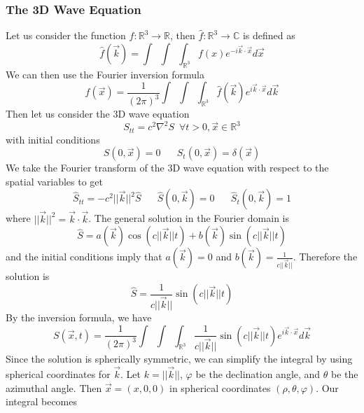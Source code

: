 \documentclass{article}
\newcommand{\R}{\mathbb{R}}
\newcommand{\twen}{\hspace{20pt}}
\newcommand{\lap}{\nabla ^2}
\newcommand{\push}{\,\,\,}
\theoremstyle{definition}
\begin{document}
\subsubsection{The 3D Wave Equation}
Let us consider the function $f:\R^3 \to \R$, then $\hat f: \R^3 \to \mathbb{C}$ is defined as 
\begin{equation*}
    \hat f(\vec k) = \int \push \int \push\int_{\R^3} f(x) e^{-i \vec k \cdot \vec x} d\vec x
\end{equation*}
We can then use the Fourier inversion formula 
\begin{equation*}
    f(\vec x) = \frac{1}{(2\pi)^3} \int \push \int \push\int_{\R^3} \hat f(\vec k) e^{i \vec k \cdot \vec x} d\vec k
\end{equation*}
Then let us consider the 3D wave equation 
\begin{equation*}
    S_{tt} = c^2 \lap S \push \forall t>0, \vec x \in \R^3
\end{equation*}
with initial conditions 
\begin{equation*}
    S(0,\vec x) = 0 \twen S_t(0,\vec x) = \delta(\vec x)
\end{equation*}
We take the Fourier transform of the 3D wave equation with respect to the spatial variables to get 
\begin{equation*}
    \hat S_{tt} = -c^2 ||\vec k||^2 \hat S \twen \hat S(0,\vec k) = 0 \twen \hat S_t(0,\vec k) = 1
\end{equation*}
where $||\vec k||^2 = \vec k \cdot \vec k$. The general solution in the Fourier domain is 
\begin{equation*}
    \hat S = a(\vec k)\cos (c||\vec k||t)+b(\vec k)\sin(c||\vec k||t)
\end{equation*}
and the initial conditions imply that $a(\vec k)=0$ and $b(\vec k) = \frac{1}{c||\vec k||}$. Therefore the solution is
\begin{equation*}
    \hat S = \frac{1}{c||\vec k||} \sin(c||\vec k||t)
\end{equation*}
By the inversion formula, we have 
\begin{equation*}
    S(\vec x,t) = \frac{1}{(2\pi)^3} \int \push \int \push\int_{\R^3} \frac{1}{c||\vec k||} \sin(c||\vec k||t) e^{i \vec k \cdot \vec x} d\vec k
\end{equation*}
Since the solution is spherically symmetric, we can simplify the integral by using spherical coordinates for $\vec k$. Let $k = ||\vec k||$, $\varphi$ be the declination angle, and $\theta$ be the azimuthal angle. Then $\vec x = (x,0,0)$ in spherical coordinates $(\rho, \theta,\varphi)$. Our integral becomes
\end{document}
